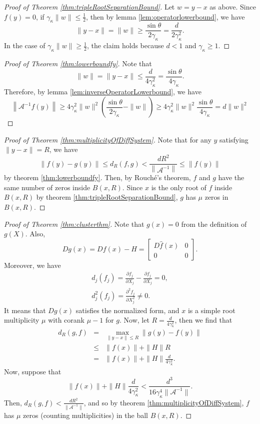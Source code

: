 \documentclass[12pt,oneside,reqno]{amsart}
\theoremstyle{definition}
\begin{document}
\begin{proof}[Proof of Theorem \ref{thm:tripleRootSeparationBound}]
	Let $w=y-x$ as above. Since $f(y)=0$, if $\gamma_\kappa\|w\|\leq \frac{1}{2}$, then by lemma \ref{lem:operatorlowerbound}, we have
	\[\|y-x\|=\|w\|\geq\frac{\sin\theta}{2\gamma_\kappa}=\frac{d}{2\gamma_\kappa^2} .\]
	In the case of $\gamma_\kappa\|w\|\geq \frac{1}{2}$, the claim holds because $d<1$ and $\gamma_\kappa\geq 1$.
\end{proof}
\begin{proof}[Proof of Theorem \ref{thm:lowerboundfy}]
	Note that 
	\[\|w\|=\|y-x\|\leq \frac{d}{4\gamma_\kappa^2}=\frac{\sin\theta}{4\gamma_\kappa}.\]
	Therefore, by lemma \ref{lem:inverseOperatorLowerbound}, we have
	\[\left\|\mathcal{A}^{-1}f(y)\right\|\geq 4\gamma_\kappa^2\|w\|^2\left(\frac{\sin\theta}{2\gamma_\kappa}-\|w\|\right)\geq4\gamma_\kappa^2\|w\|^2\frac{\sin\theta}{4\gamma_\kappa}=d\|w\|^2\]
\end{proof}
\begin{proof}[Proof of Theorem \ref{thm:multiplicityOfDiffSystem}]
	Note that for any $y$ satisfying $\|y-x\|=R$, we have
	\[\|f(y)-g(y)\|\leq d_R(f,g)<\frac{dR^2}{\left\|\mathcal{A}^{-1}\right\|}\leq \|f(y)\|\]
	by theorem \ref{thm:lowerboundfy}. Then, by Rouch\'e's theorem, $f$ and $g$ have the same number of zeros inside $B(x,R)$. Since $x$ is the only root of $f$ inside $B(x,R)$ by theorem \ref{thm:tripleRootSeparationBound}, $g$ has $\mu$ zeros in $B(x,R)$.
\end{proof}
\begin{proof}[Proof of Theorem \ref{thm:clusterthm}]
	Note that $g(x)=0$ from the definition of $g(X)$. Also, 
	\[Dg(x)=Df(x)-H=\begin{bmatrix}
	D\hat{f}(x) & 0 \\
	0 & 0
	\end{bmatrix}.\]
	Moreover, we have 
	\begin{eqnarray*}
	d_j(f_j) = \frac{\partial f_{j}}{\partial X_j} - \frac{\partial f_{j}}{\partial X_j} = 0,\\
	d_j^2(f_j) = \frac{\partial^2 f_{j}}{\partial X_j^2}\ne 0.
	\end{eqnarray*}
	It means that $Dg(x)$ satisfies the normalized form, and $x$ is a simple root multiplicity $\mu$ with corank $\mu - 1$ for $g$. Now, let $R=\frac{d}{4\gamma_\kappa^2}$, then we find that 
	\begin{eqnarray*}
	d_R(g,f)&=&\max\limits_{\|y-x\|\leq R}\|g(y)-f(y)\|\\
	& \leq & \|f(x)\|+\|H\|R\\
	& = & \|f(x)\|+\|H\|\frac{d}{4\gamma_\kappa^2}.
	\end{eqnarray*}
	Now, suppose that 
	\[\|f(x)\|+\|H\|\frac{d}{4\gamma_\kappa^2}<\frac{d^3}{16\gamma_\kappa^4\|\mathcal{A}^{-1}\|}.\]
	Then, $d_R(g,f)< \frac{dR^2}{\|\mathcal{A}^{-1}\|}$, and so by theorem \ref{thm:multiplicityOfDiffSystem}, $f$ has $\mu$ zeros (counting multiplicities) in the ball $B(x,R)$.
\end{proof}


	
\end{document}

